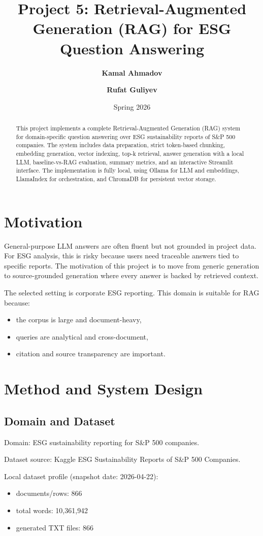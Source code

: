 \documentclass[11pt]{article}
\title{Project 5: Retrieval-Augmented Generation (RAG) for ESG Question Answering}
\author{\textbf{Kamal Ahmadov} \and \textbf{Rufat Guliyev}}
\date{Spring 2026}
\newcommand{\docCount}{866}
\newcommand{\wordCount}{10{,}361{,}942}
\newcommand{\profileDate}{2026-04-22}
\begin{document}
\maketitle

\begin{abstract}
This project implements a complete Retrieval-Augmented Generation (RAG) system for domain-specific question answering over ESG sustainability reports of S\&P 500 companies. The system includes data preparation, strict token-based chunking, embedding generation, vector indexing, top-k retrieval, answer generation with a local LLM, baseline-vs-RAG evaluation, summary metrics, and an interactive Streamlit interface. The implementation is fully local, using Ollama for LLM and embeddings, LlamaIndex for orchestration, and ChromaDB for persistent vector storage.
\end{abstract}

\section{Motivation}
General-purpose LLM answers are often fluent but not grounded in project data. For ESG analysis, this is risky because users need traceable answers tied to specific reports. The motivation of this project is to move from generic generation to source-grounded generation where every answer is backed by retrieved context.

The selected setting is corporate ESG reporting. This domain is suitable for RAG because:
\begin{itemize}
    \item the corpus is large and document-heavy,
    \item queries are analytical and cross-document,
    \item citation and source transparency are important.
\end{itemize}

\section{Method and System Design}
\subsection{Domain and Dataset}
Domain: ESG sustainability reporting for S\&P 500 companies.

Dataset source: Kaggle ESG Sustainability Reports of S\&P 500 Companies.

Local dataset profile (snapshot date: \profileDate):
\begin{itemize}
    \item documents/rows: \docCount
    \item total words: \wordCount
    \item generated TXT files: \docCount
\end{itemize}
\end{document}
